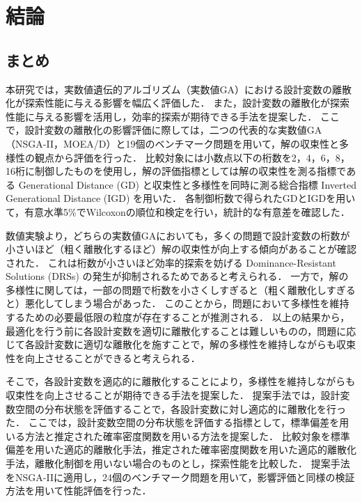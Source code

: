 \documentclass[../main/main]{subfiles}
\begin{document}
\chapter{結論}
\section{まとめ}
\quad 本研究では，実数値遺伝的アルゴリズム（実数値GA）における設計変数の離散化が探索性能に与える影響を幅広く評価した．
また，設計変数の離散化が探索性能に与える影響を活用し，効率的探索が期待できる手法を提案した．
ここで，設計変数の離散化の影響評価に際しては，二つの代表的な実数値GA（NSGA-II，MOEA/D）と19個のベンチマーク問題を用いて，解の収束性と多様性の観点から評価を行った．
比較対象には小数点以下の桁数を2，4，6，8，16桁に制御したものを使用し，解の評価指標としては解の収束性を測る指標である Generational Distance (GD) と収束性と多様性を同時に測る総合指標 Inverted Generational Distance (IGD) を用いた．
各制御桁数で得られたGDとIGDを用いて，有意水準5\%でWilcoxonの順位和検定を行い，統計的な有意差を確認した．

数値実験より，どちらの実数値GAにおいても，多くの問題で設計変数の桁数が小さいほど（粗く離散化するほど）解の収束性が向上する傾向があることが確認された．
これは桁数が小さいほど効率的探索を妨げる Dominance-Resistant Solutions (DRSs) の発生が抑制されるためであると考えられる．
一方で，解の多様性に関しては，一部の問題で桁数を小さくしすぎると（粗く離散化しすぎると）悪化してしまう場合があった．
このことから，問題において多様性を維持するための必要最低限の粒度が存在することが推測される．
以上の結果から，最適化を行う前に各設計変数を適切に離散化することは難しいものの，問題に応じて各設計変数に適切な離散化を施すことで，解の多様性を維持しながらも収束性を向上させることができると考えられる．

そこで，各設計変数を適応的に離散化することにより，多様性を維持しながらも収束性を向上させることが期待できる手法を提案した．
提案手法では，設計変数空間の分布状態を評価することで，各設計変数に対し適応的に離散化を行った．
ここでは，設計変数空間の分布状態を評価する指標として，標準偏差を用いる方法と推定された確率密度関数を用いる方法を提案した．
比較対象を標準偏差を用いた適応的離散化手法，推定された確率密度関数を用いた適応的離散化手法，離散化制御を用いない場合のものとし，探索性能を比較した．
提案手法をNSGA-IIに適用し，24個のベンチマーク問題を用いて，影響評価と同様の検証方法を用いて性能評価を行った．
\end{document}
